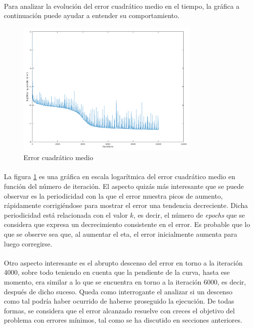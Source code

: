 \documentclass[12pt, twocolumn]{article}
\begin{document}
	\paragraph{} Para analizar la evolución del error cuadrático medio en el tiempo, la gráfica a continuación puede ayudar a entender su comportamiento. 
	
	\begin{figure}[H]
		\centering
		\includegraphics[width=9cm]{../results/adaptive_eta_incremental/3/log_incremental.png}
		\caption{Error cuadrático medio}
		\label{error1}
	\end{figure}
	
	\paragraph{} La figura \ref{error1} es una gráfica en escala logarítmica del error cuadrático medio en función del número de iteración. El aspecto quizás más interesante que se puede observar es la periodicidad con la que el error muestra picos de aumento, rápidamente corrigiéndose para mostrar el error una tendencia decreciente. Dicha periodicidad está relacionada con el valor $k$, es decir, el número de \textit{epochs} que se considera que expresa un decrecimiento consistente en el error. Es probable que lo que se observe sea que, al aumentar el eta, el error inicialmente aumenta para luego corregirse.
	
	\paragraph{} Otro aspecto interesante es el abrupto descenso del error en torno a la iteración 4000, sobre todo teniendo en cuenta que la pendiente de la curva, hasta ese momento, era similar a lo que se encuentra en torno a la iteración 6000, es decir, después de dicho suceso. Queda como interrogante el analizar si un descenso como tal podría haber ocurrido de haberse proseguido la ejecución. De todas formas, se considera que el error alcanzado resuelve con creces el objetivo del problema con errores mínimos, tal como se ha discutido en secciones anteriores. 

	

	
	
	
	
	
	
	
	
\end{document}
